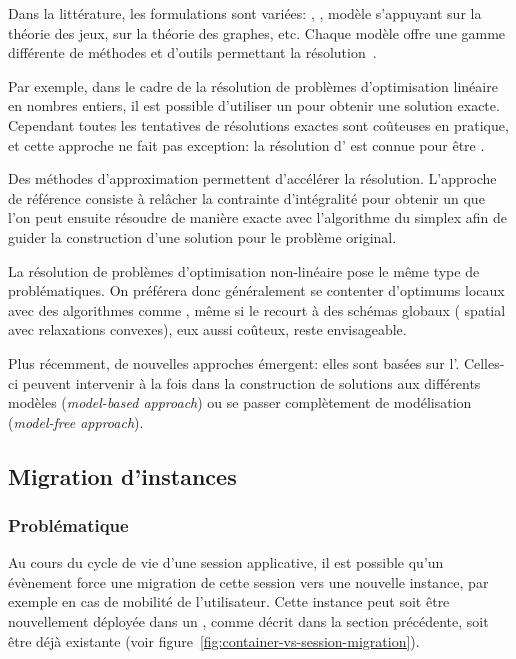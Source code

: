 \documentclass[../main.tex]{subfiles}
\begin{document}
Dans la littérature, les formulations sont variées: , , modèle s’appuyant sur la théorie des jeux, sur la théorie des graphes, etc.
Chaque modèle offre une gamme différente de méthodes et d’outils permettant la résolution~\cite{10.1109/COMST.2021.3101460}.

Par exemple, dans le cadre de la résolution de problèmes d’optimisation linéaire en nombres entiers, il est possible d’utiliser un  pour obtenir une solution exacte.
Cependant toutes les tentatives de résolutions exactes sont coûteuses en pratique, et cette approche ne fait pas exception: la résolution d’ est connue pour être .

Des méthodes d’approximation permettent d’accélérer la résolution.
L’approche de référence consiste à relâcher la contrainte d’intégralité pour obtenir un  que l’on peut ensuite résoudre de manière exacte avec l’algorithme du simplex afin de guider la construction d’une solution pour le problème original.

\pagebreak
La résolution de problèmes d’optimisation non-linéaire pose le même type de problématiques.
On préférera donc généralement se contenter d’optimums locaux avec des algorithmes comme , même si le recourt à des schémas globaux ( spatial avec relaxations convexes), eux aussi coûteux, reste envisageable.

Plus récemment, de nouvelles approches émergent: elles sont basées sur l’.
Celles-ci peuvent intervenir à la fois dans la construction de solutions aux différents modèles (\textit{model-based approach}) ou se passer complètement de modélisation (\textit{model-free approach}).

\subsection{Migration d’instances}
\subsubsection{Problématique}
Au cours du cycle de vie d’une session applicative, il est possible qu’un évènement force une migration de cette session vers une nouvelle instance, par exemple en cas de mobilité de l’utilisateur.
Cette instance peut soit être nouvellement déployée dans un , comme décrit dans la section précédente, soit être déjà existante (voir figure~\ref{fig:container-vs-session-migration}).
\end{document}

